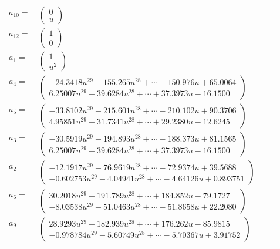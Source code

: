 \documentclass[1p]{elsarticle_modified}
\theoremstyle{definition}
\begin{document}
\begin{tabular}{m{7pt} m{180pt} m{7pt} m{180pt} }
\flushright $a_{10}=$&$\begin{pmatrix}0\\u\end{pmatrix}$ \\
\flushright $a_{12}=$&$\begin{pmatrix}1\\0\end{pmatrix}$ \\
\flushright $a_{1}=$&$\begin{pmatrix}1\\u^2\end{pmatrix}$ \\
\flushright $a_{4}=$&$\begin{pmatrix}-24.3418 u^{29}-155.265 u^{28}+\cdots-150.976 u+65.0064\\6.25007 u^{29}+39.6284 u^{28}+\cdots+37.3973 u-16.1500\end{pmatrix}$ \\
\flushright $a_{5}=$&$\begin{pmatrix}-33.8102 u^{29}-215.601 u^{28}+\cdots-210.102 u+90.3706\\4.95851 u^{29}+31.7341 u^{28}+\cdots+29.2380 u-12.6245\end{pmatrix}$ \\
\flushright $a_{3}=$&$\begin{pmatrix}-30.5919 u^{29}-194.893 u^{28}+\cdots-188.373 u+81.1565\\6.25007 u^{29}+39.6284 u^{28}+\cdots+37.3973 u-16.1500\end{pmatrix}$ \\
\flushright $a_{2}=$&$\begin{pmatrix}-12.1917 u^{29}-76.9619 u^{28}+\cdots-72.9374 u+39.5688\\-0.602753 u^{29}-4.04941 u^{28}+\cdots-4.64126 u+0.893751\end{pmatrix}$ \\
\flushright $a_{6}=$&$\begin{pmatrix}30.2018 u^{29}+191.789 u^{28}+\cdots+184.852 u-79.1727\\-8.03538 u^{29}-51.0463 u^{28}+\cdots-51.8658 u+22.2080\end{pmatrix}$ \\
\flushright $a_{9}=$&$\begin{pmatrix}28.9293 u^{29}+182.939 u^{28}+\cdots+176.262 u-85.9815\\-0.978784 u^{29}-5.60749 u^{28}+\cdots-5.70367 u+3.91752\end{pmatrix}$ \\

\end{tabular}
\end{document}

